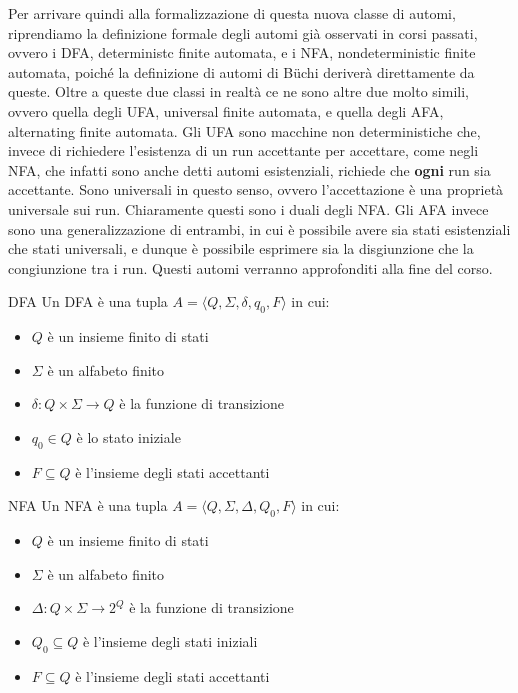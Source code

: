 Per arrivare quindi alla formalizzazione di questa nuova classe di automi, riprendiamo la definizione formale degli automi già osservati in corsi passati, ovvero i DFA, deterministc finite automata, e i NFA, nondeterministic finite automata, poiché la definizione di automi di Büchi deriverà direttamente da queste. Oltre a queste due classi in realtà ce ne sono altre due molto simili, ovvero quella degli UFA, universal finite automata, e quella degli AFA, alternating finite automata. Gli UFA sono macchine non deterministiche che, invece di richiedere l'esistenza di un run accettante per accettare, come negli NFA, che infatti sono anche detti automi esistenziali, richiede che \textbf{ogni} run sia accettante. Sono universali in questo senso, ovvero l'accettazione è una proprietà universale sui run. Chiaramente questi sono i duali degli NFA. Gli AFA invece sono una generalizzazione di entrambi, in cui è possibile avere sia stati esistenziali che stati universali, e dunque è possibile esprimere sia la disgiunzione che la congiunzione tra i run. Questi automi verranno approfonditi alla fine del corso.

\begin{definition}{DFA}
  Un DFA è una tupla \(A = \langle Q, \Sigma, \delta, q_0, F\rangle\) in cui:
  \begin{itemize}
    \item \(Q\) è un insieme finito di stati
    \item \(\Sigma\) è un alfabeto finito
    \item \(\delta: Q \times \Sigma \to Q\) è la funzione di transizione
    \item \(q_0 \in Q\) è lo stato iniziale
    \item \(F \subseteq Q\) è l'insieme degli stati accettanti
  \end{itemize}
\end{definition}

\begin{definition}{NFA}
  Un NFA è una tupla \(A = \langle Q, \Sigma, \Delta, Q_0, F\rangle\) in cui:
  \begin{itemize}
    \item \(Q\) è un insieme finito di stati
    \item \(\Sigma\) è un alfabeto finito
    \item \(\Delta: Q \times \Sigma \to 2^Q\) è la funzione di transizione
    \item \(Q_0 \subseteq Q\) è l'insieme degli stati iniziali
    \item \(F \subseteq Q\) è l'insieme degli stati accettanti
  \end{itemize}
\end{definition}

